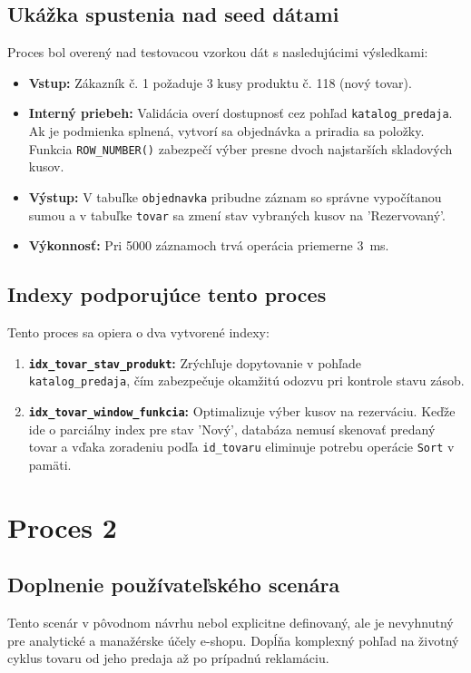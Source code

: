 \documentclass[11pt, a4paper]{article}
\begin{document}
\subsection{Ukážka spustenia nad seed dátami}
Proces bol overený nad testovacou vzorkou dát s nasledujúcimi výsledkami:

\begin{itemize}
    \item \textbf{Vstup:} Zákazník č. 1 požaduje 3 kusy produktu č. 118 (nový tovar).
    \item \textbf{Interný priebeh:} Validácia overí dostupnosť cez pohľad \texttt{katalog\_predaja}. Ak je podmienka splnená, vytvorí sa objednávka a priradia sa položky. Funkcia \texttt{ROW\_NUMBER()} zabezpečí výber presne dvoch najstarších skladových kusov.
    \item \textbf{Výstup:} V tabuľke \texttt{objednavka} pribudne záznam so správne vypočítanou sumou a v tabuľke \texttt{tovar} sa zmení stav vybraných kusov na 'Rezervovaný'.
    \item \textbf{Výkonnosť:} Pri 5000 záznamoch trvá operácia priemerne 3~ms.
\end{itemize}

\subsection{Indexy podporujúce tento proces}
Tento proces sa opiera o dva vytvorené indexy:

\begin{enumerate}
    \item \textbf{\texttt{idx\_tovar\_stav\_produkt}:} Zrýchľuje dopytovanie v pohľade \texttt{katalog\_predaja}, čím zabezpečuje okamžitú odozvu pri kontrole stavu zásob.
    \item \textbf{\texttt{idx\_tovar\_window\_funkcia}:} Optimalizuje výber kusov na rezerváciu. Keďže ide o parciálny index pre stav 'Nový', databáza nemusí skenovať predaný tovar a vďaka zoradeniu podľa \texttt{id\_tovaru} eliminuje potrebu operácie \texttt{Sort} v pamäti.
\end{enumerate}


\newpage
\section{Proces 2}
\label{sec:proces_2}

\subsection{Doplnenie používateľského scenára}
Tento scenár v pôvodnom návrhu nebol explicitne definovaný, ale je nevyhnutný pre analytické a manažérske účely e-shopu. Dopĺňa komplexný pohľad na životný cyklus tovaru od jeho predaja až po prípadnú reklamáciu.
\end{document}
